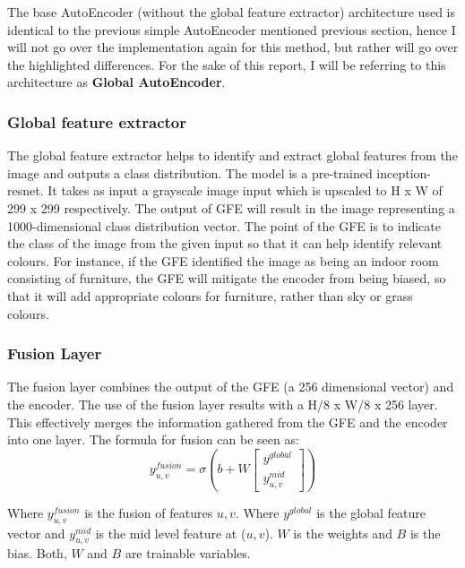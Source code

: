 The base AutoEncoder (without the global feature extractor) architecture used is identical to the previous simple AutoEncoder mentioned previous section, hence I will not go over the implementation again for this method, but rather will go over the highlighted differences. For the sake of this report, I will be referring to this architecture as \textbf{Global AutoEncoder}.

\subsubsection*{Global feature extractor}


The global feature extractor helps to identify and extract global features from the image and outputs a class distribution. The model is a pre-trained inception-resnet. It takes as input a grayscale image input which is upscaled to H x W of 299 x 299 respectively. The output of GFE will result in the image representing a 1000-dimensional class distribution vector. The point of the GFE is to indicate the class of the image from the given input so that it can help identify relevant colours. For instance, if the GFE identified the image as being an indoor room consisting of furniture, the GFE will mitigate the encoder from being biased, so that it will add appropriate colours for furniture, rather than sky or grass colours. 

\subsubsection*{Fusion Layer}



The fusion layer combines the output of the GFE (a 256 dimensional vector) and the encoder. The use of the fusion layer results with a H/8 x W/8 x 256 layer. This effectively merges the information gathered from the GFE and the encoder into one layer. The formula for fusion can be seen as:
\begin{equation}
y_{u,v}^{fusion} = \sigma \left ( b + W \begin{bmatrix}y^{global} \\y_{u,v}^{mid}  \end{bmatrix} \right )
\end{equation}

Where \(y_{u,v}^{fusion}\) is the fusion of features \(u,v\). Where \(y^{global} \) is the global feature vector and \(y_{u,v}^{mid} \) is the mid level feature at (\(u,v\)). \(W\) is the weights and \(B\) is the bias. Both, \(W\) and \(B\) are trainable variables. 


